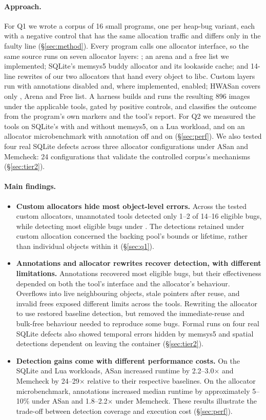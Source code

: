 \paragraph{Approach.} For Q1 we wrote a corpus of 16 small programs, one per heap-bug variant, each with a negative control that has the same allocation traffic and differs only in the faulty line (\S\ref{sec:method}). Every program calls one allocator interface, so the same source runs on seven allocator layers: ; an arena and a free list we implemented; SQLite's memsys5 buddy allocator and its lookaside cache; and 14-line rewrites of our two allocators that hand every object to libc. Custom layers run with annotations disabled and, where implemented, enabled; HWASan covers only , Arena and Free list. A harness builds and runs the resulting 896 images under the applicable tools, gated by positive controls, and classifies the outcome from the program's own markers and the tool's report. For Q2 we measured the tools on SQLite's  with and without memsys5, on a Lua workload, and on an allocator microbenchmark with annotation off and on (\S\ref{sec:perf}). We also tested four real SQLite defects across three allocator configurations under ASan and Memcheck: 24 configurations that validate the controlled corpus's mechanisms (\S\ref{sec:tier2}).

\paragraph{Main findings.}
\begin{itemize}
\item \textbf{Custom allocators hide most object-level errors.} Across the tested custom allocators, unannotated tools detected only 1--2 of 14--16 eligible bugs, while detecting most eligible bugs under . The detections retained under custom allocation concerned the backing pool's bounds or lifetime, rather than individual objects within it (\S\ref{sec:q1}).
\item \textbf{Annotations and allocator rewrites recover detection, with different limitations.} Annotations recovered most eligible bugs, but their effectiveness depended on both the tool's interface and the allocator's behaviour. Overflows into live neighbouring objects, stale pointers after reuse, and invalid frees exposed different limits across the tools. Rewriting the allocator to use  restored baseline detection, but removed the immediate-reuse and bulk-free behaviour needed to reproduce some bugs. Formal runs on four real SQLite defects also showed temporal errors hidden by memsys5 and spatial detections dependent on leaving the container (\S\ref{sec:tier2}).
\item \textbf{Detection gains come with different performance costs.} On the SQLite and Lua workloads, ASan increased runtime by 2.2--3.0$\times$ and Memcheck by 24--29$\times$ relative to their respective baselines. On the allocator microbenchmark, annotations increased median runtime by approximately 5--10\% under ASan and 1.8--2.2$\times$ under Memcheck. These results illustrate the trade-off between detection coverage and execution cost (\S\ref{sec:perf}).
\end{itemize}

